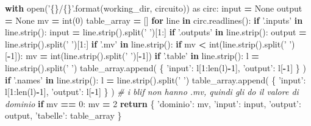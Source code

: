 \documentclass[italian,]{book}
\newenvironment{Shaded}{\begin{snugshade}}{\end{snugshade}}
\newcommand{\BuiltInTok}[1]{#1}
\newcommand{\CommentTok}[1]{\textcolor[rgb]{0.56,0.35,0.01}{\textit{#1}}}
\newcommand{\ControlFlowTok}[1]{\textcolor[rgb]{0.13,0.29,0.53}{\textbf{#1}}}
\newcommand{\DecValTok}[1]{\textcolor[rgb]{0.00,0.00,0.81}{#1}}
\newcommand{\ImportTok}[1]{#1}
\newcommand{\KeywordTok}[1]{\textcolor[rgb]{0.13,0.29,0.53}{\textbf{#1}}}
\newcommand{\NormalTok}[1]{#1}
\newcommand{\OperatorTok}[1]{\textcolor[rgb]{0.81,0.36,0.00}{\textbf{#1}}}
\newcommand{\SpecialCharTok}[1]{\textcolor[rgb]{0.00,0.00,0.00}{#1}}
\newcommand{\StringTok}[1]{\textcolor[rgb]{0.31,0.60,0.02}{#1}}
\newcommand{\VariableTok}[1]{\textcolor[rgb]{0.00,0.00,0.00}{#1}}
\begin{document}
\begin{Shaded}
\begin{Highlighting}[]
\ControlFlowTok{with} \BuiltInTok{open}\NormalTok{(}\StringTok{'}\SpecialCharTok{\{\}}\StringTok{/}\SpecialCharTok{\{\}}\StringTok{'}\NormalTok{.}\BuiltInTok{format}\NormalTok{(working_dir, circuito)) }\ImportTok{as}\NormalTok{ circ:}
  \BuiltInTok{input} \OperatorTok{=} \VariableTok{None}
\NormalTok{  output }\OperatorTok{=} \VariableTok{None}
\NormalTok{  mv }\OperatorTok{=} \BuiltInTok{int}\NormalTok{(}\DecValTok{0}\NormalTok{)}
\NormalTok{  table_array }\OperatorTok{=}\NormalTok{ []}
  \ControlFlowTok{for}\NormalTok{ line }\KeywordTok{in}\NormalTok{ circ.readlines():}
    \ControlFlowTok{if} \StringTok{'.inputs'} \KeywordTok{in}\NormalTok{ line.strip():}
      \BuiltInTok{input} \OperatorTok{=}\NormalTok{ line.strip().split(}\StringTok{' '}\NormalTok{)[}\DecValTok{1}\NormalTok{:]}
    \ControlFlowTok{if} \StringTok{'.outputs'} \KeywordTok{in}\NormalTok{ line.strip():}
\NormalTok{      output }\OperatorTok{=}\NormalTok{ line.strip().split(}\StringTok{' '}\NormalTok{)[}\DecValTok{1}\NormalTok{:]}
    \ControlFlowTok{if} \StringTok{'.mv'} \KeywordTok{in}\NormalTok{ line.strip():}
      \ControlFlowTok{if}\NormalTok{ mv }\OperatorTok{<} \BuiltInTok{int}\NormalTok{(line.strip().split(}\StringTok{' '}\NormalTok{)[}\OperatorTok{-}\DecValTok{1}\NormalTok{]):}
\NormalTok{        mv }\OperatorTok{=} \BuiltInTok{int}\NormalTok{(line.strip().split(}\StringTok{' '}\NormalTok{)[}\OperatorTok{-}\DecValTok{1}\NormalTok{])}
    \ControlFlowTok{if} \StringTok{'.table'} \KeywordTok{in}\NormalTok{ line.strip():}
\NormalTok{      l }\OperatorTok{=}\NormalTok{ line.strip().split(}\StringTok{' '}\NormalTok{)}
\NormalTok{      table_array.append(}
\NormalTok{        \{}
          \StringTok{'input'}\NormalTok{:    l[}\DecValTok{1}\NormalTok{:}\BuiltInTok{len}\NormalTok{(l)}\OperatorTok{-}\DecValTok{1}\NormalTok{],}
          \StringTok{'output'}\NormalTok{:   l[}\OperatorTok{-}\DecValTok{1}\NormalTok{]}
\NormalTok{        \}}
\NormalTok{      )}
    \ControlFlowTok{if} \StringTok{'.names'} \KeywordTok{in}\NormalTok{ line.strip():}
\NormalTok{      l }\OperatorTok{=}\NormalTok{ line.strip().split(}\StringTok{' '}\NormalTok{)}
\NormalTok{      table_array.append(}
\NormalTok{        \{}
          \StringTok{'input'}\NormalTok{:    l[}\DecValTok{1}\NormalTok{:}\BuiltInTok{len}\NormalTok{(l)}\OperatorTok{-}\DecValTok{1}\NormalTok{],}
          \StringTok{'output'}\NormalTok{:   l[}\OperatorTok{-}\DecValTok{1}\NormalTok{]}
\NormalTok{        \}}
\NormalTok{      )}
  \CommentTok{# i blif non hanno .mv, quindi gli do il valore di dominio}
  \ControlFlowTok{if}\NormalTok{ mv }\OperatorTok{==} \DecValTok{0}\NormalTok{:}
\NormalTok{    mv }\OperatorTok{=} \DecValTok{2}
  \ControlFlowTok{return}\NormalTok{ \{}
    \StringTok{'dominio'}\NormalTok{:   mv,}
    \StringTok{'input'}\NormalTok{:    }\BuiltInTok{input}\NormalTok{,}
    \StringTok{'output'}\NormalTok{:   output,}
    \StringTok{'tabelle'}\NormalTok{:  table_array}
\NormalTok{  \}}
\end{Highlighting}
\end{Shaded}
\end{document}
